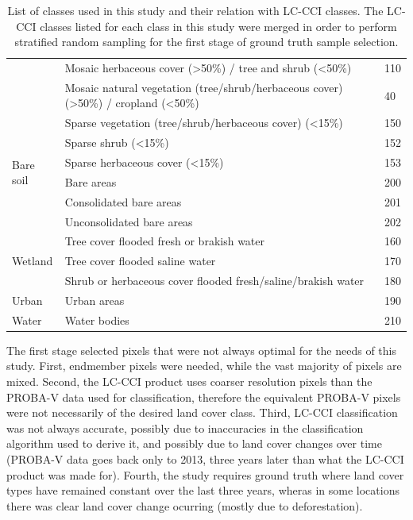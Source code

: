\documentclass[a4paper,10pt]{book}
\begin{document}
\begin{table}
\begin{center}
{\begin{tabular}{lp{9cm}l}
	  & Mosaic herbaceous cover (>50\%) / tree and shrub (<50\%) & 110 \\
	  & Mosaic natural vegetation (tree/shrub/herbaceous cover) (>50\%) / cropland (<50\%) & 40 \\
	\hline
	\multirow{6}{*}{Bare soil} & Sparse vegetation (tree/shrub/herbaceous cover) (<15\%) & 150 \\
	  & Sparse shrub (<15\%) & 152 \\
	  & Sparse herbaceous cover (<15\%) & 153 \\
	  & Bare areas & 200 \\
	  & Consolidated bare areas & 201 \\
	  & Unconsolidated bare areas & 202 \\
	\hline
	\multirow{3}{*}{Wetland} & Tree cover flooded fresh or brakish water & 160 \\
	  & Tree cover flooded saline water & 170 \\
	  & Shrub or herbaceous cover flooded fresh/saline/brakish water & 180 \\
	\hline
	Urban & Urban areas & 190 \\
	\hline
	Water & Water bodies & 210 \\
	\hline
      \end{tabular}
    }
  \end{center}
  \caption{List of classes used in this study and their relation with LC-CCI classes. The LC-CCI classes listed for each class in this study were merged in order to perform stratified random sampling for the first stage of ground truth sample selection.}
  \label{tbl-classes}
\end{table}

The first stage selected pixels that were not always optimal for the needs of this study. First, endmember pixels were needed, while the vast majority of pixels are mixed. Second, the LC-CCI product uses coarser resolution pixels than the PROBA-V data used for classification, therefore the equivalent PROBA-V pixels were not necessarily of the desired land cover class. Third, LC-CCI classification was not always accurate, possibly due to inaccuracies in the classification algorithm used to derive it, and possibly due to land cover changes over time (PROBA-V data goes back only to 2013, three years later than what the LC-CCI product was made for). Fourth, the study requires ground truth where land cover types have remained constant over the last three years, wheras in some locations there was clear land cover change ocurring (mostly due to deforestation).
\end{document}
